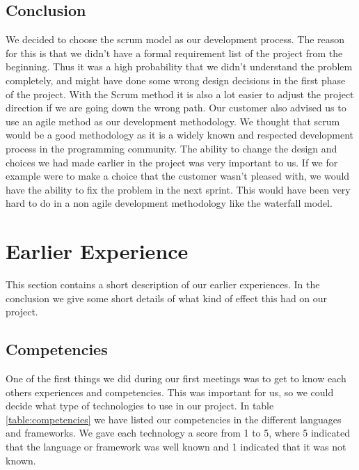 \subsection{Conclusion}

We decided to choose the scrum model as our development process. 
The reason for this is that we didn't have a formal requirement list of the project from the beginning.
Thus it was a high probability that we didn't understand the problem completely, and might have done some wrong design decisions in the first phase of the project. 
With the Scrum method it is also a lot easier to adjust the project direction if we are going down the wrong path.
Our customer also advised us to use an agile method as our development methodology.
We thought that scrum would be a good methodology as it is a widely known and respected development process in the programming community.
The ability to change the design and choices we had made earlier in the project was very important to us.
If we for example were to make a choice that the customer wasn't pleased with, we would have the ability to fix the problem in the next sprint.
This would have been very hard to do in a non agile development methodology like the waterfall model.


\section{Earlier Experience}
\label{section:earlier-experience}

This section contains a short description of our earlier experiences.
In the conclusion we give some short details of what kind of effect this had on our project.

\subsection{Competencies}

One of the first things we did during our first meetings was to get to know each others experiences and competencies.
This was important for us, so we could decide what type of technologies to use in our project.
In table \ref{table:competencies} we have listed our competencies in the different languages and frameworks.
We gave each technology a score from 1 to 5, where 5 indicated that the language or framework was well known and 1 indicated that it was not known.

